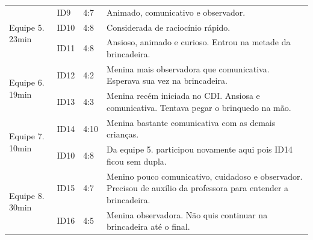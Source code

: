 \begin{quadro}[!h]
{\begin{footnotesize}
{\begin{tabular}{|l|l|l|p{11cm}|}
            \hline
            \multirow{3}{*}{Equipe 5. 23min}                & ID9               & 4:7                          & Animado, comunicativo e observador.                                                                                \\ 
            \cline{2-4}
                                                            & ID10              & 4:8                          & Considerada de raciocínio rápido.                                                                                  \\ 
            \cline{2-4}
                                                            & ID11              & 4:8                          & Ansioso, animado e curioso. Entrou na metade da brincadeira.                                                       \\ 
            \hline
            \multirow{2}{*}{Equipe 6. 19min}                & ID12              & 4:2                          & Menina mais observadora que comunicativa. Esperava sua vez na brincadeira.                                         \\ 
            \cline{2-4}
                                                            & ID13              & 4:3                          & Menina recém iniciada no CDI. Ansiosa e comunicativa. Tentava pegar o brinquedo na mão.                            \\ 
            \hline
            \multirow{2}{*}{Equipe 7. 10min}                & ID14              & 4:10                         & Menina bastante comunicativa com as demais crianças.                                                               \\ 
            \cline{2-4}
                                                            & ID10              & 4:8                          & Da equipe 5. participou novamente aqui pois ID14 ficou sem dupla.                                                  \\ 
            \hline
            \multirow{2}{*}{Equipe 8. 30min}                & ID15              & 4:7                          & Menino pouco comunicativo, cuidadoso e observador. Precisou de auxílio da professora para entender a brincadeira.  \\ 
            \cline{2-4}
                                                            & ID16              & 4:5                          & Menina observadora. Não quis continuar na brincadeira até o final.                                                 \\ 

\end{tabular}}
\end{footnotesize}}
\end{quadro}
